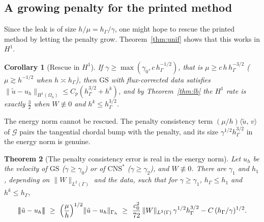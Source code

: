 \documentclass[pdflatex,sn-mathphys-num]{sn-jnl}
\theoremstyle{thmstyleone}
\newtheorem{theorem}{Theorem}[section]
\newtheorem{corollary}[theorem]{Corollary}
\theoremstyle{thmstylethree}
\newcommand{\hG}{h_\Gamma}
\newcommand{\Gh}{\Gamma_h}
\newcommand{\Oh}{\Omega_h}
\newcommand{\ut}{\tilde u}
\newcommand{\ip}[2]{\langle #1,\, #2\rangle}
\newcommand{\tnorm}[1]{|\!|\!|#1|\!|\!|}
\newcommand{\norm}[1]{\lVert #1\rVert}
\newcommand{\GS}{\mathrm{GS}}
\newcommand{\CNS}{\mathrm{CNS}^\ast}
\newcommand{\Gc}{\mathcal G}
\begin{document}
\subsection{A growing penalty for the printed method}\label{sec:growing}
Since the leak is of size $h/\mu=\hG/\gamma$, one might hope to rescue the printed method by letting the penalty grow. Theorem~\ref{thm:unif} shows that this works in $H^1$.

\begin{corollary}[Rescue in $H^1$]\label{cor:rescue}
If $\gamma\ge\max(\gamma_0,c\,\hG^{-1/2})$, that is $\mu\ge c\,h\,\hG^{-3/2}$ ($\mu\gtrsim h^{-1/2}$ when $h\asymp\hG$), then $\GS$ with flux-corrected data satisfies $\norm{\ut-u_h}_{H^1(\Oh)}\le C_p(\hG^{3/2}+h^k)$, and by Theorem~\ref{thm:lb} the $H^1$ rate is exactly $\frac32$ when $W\not\equiv0$ and $h^k\le\hG^{3/2}$.
\end{corollary}

The energy norm cannot be rescued. The penalty consistency term $(\mu/h)\ip{\ut}{v}$ of $\Gc$ pairs the tangential chordal bump with the penalty, and its size $\gamma^{1/2}\hG^{3/2}$ in the energy norm is genuine.

\begin{theorem}[The penalty consistency error is real in the energy norm]\label{thm:elower}
Let $u_h$ be the velocity of $\GS$ ($\gamma\ge\gamma_0$) or of $\CNS$ ($\gamma\ge\gamma_2$), and $W\not\equiv0$. There are $\gamma_1$ and $h_1$, depending on $\norm W_{L^2(\Gamma)}$ and the data, such that for $\gamma\ge\gamma_1$, $\hG\le h_1$ and $h^k\le\hG$,
\[
\tnorm{\ut-u_h}\ \ge\ \Bigl(\frac\mu h\Bigr)^{1/2}\norm{\ut-u_h}_{\Gh}\ \ge\ \frac{c_0^2}{72}\,\norm{W}_{L^2(\Gamma)}\,\gamma^{1/2}\hG^{3/2}-C\,(\hG/\gamma)^{1/2}.
\]
\end{theorem}
\end{document}

